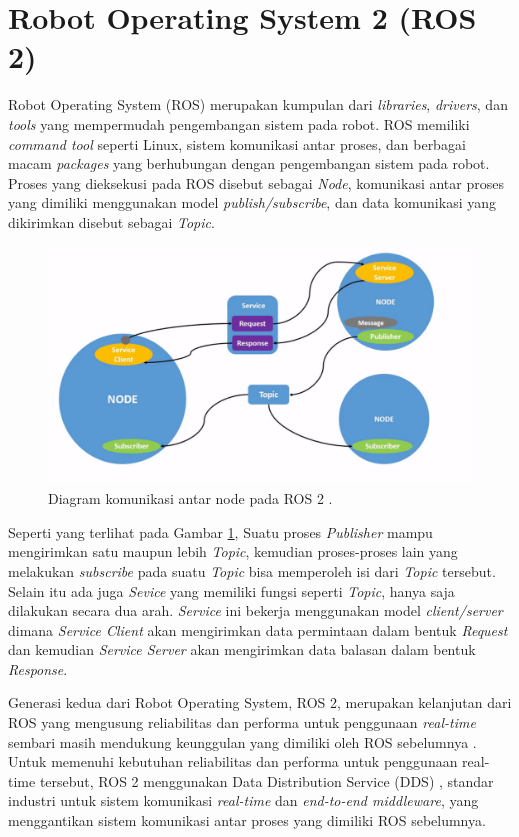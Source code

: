 \section{Robot Operating System 2 (ROS 2)}
\label{sec:sociallyassistiverobots}

Robot Operating System (ROS) \citep{cit:quigley2009} merupakan kumpulan dari \emph{libraries}, \emph{drivers}, dan \emph{tools} yang mempermudah pengembangan sistem pada robot.
ROS memiliki \emph{command tool} seperti Linux, sistem komunikasi antar proses, dan berbagai macam \emph{packages} yang berhubungan dengan pengembangan sistem pada robot.
Proses yang dieksekusi pada ROS disebut sebagai \emph{Node}, komunikasi antar proses yang dimiliki menggunakan model \emph{publish/subscribe}, dan data komunikasi yang dikirimkan disebut sebagai \emph{Topic}.

\begin{figure} [ht]
  \centering
	\includegraphics[scale=0.45]{gambar/komunikasi-ros.png}
	\caption{Diagram komunikasi antar node pada ROS 2 \citep{url:ros2nodes}.}
	\label{fig:komunikasiros}
\end{figure}

Seperti yang terlihat pada Gambar \ref{fig:komunikasiros}, Suatu proses \emph{Publisher} mampu mengirimkan satu maupun lebih \emph{Topic}, kemudian proses-proses lain yang melakukan \emph{subscribe} pada suatu \emph{Topic} bisa memperoleh isi dari \emph{Topic} tersebut.
Selain itu ada juga \emph{Sevice} yang memiliki fungsi seperti \emph{Topic}, hanya saja dilakukan secara dua arah.
\emph{Service} ini bekerja menggunakan model \emph{client/server} dimana \emph{Service Client} akan mengirimkan data permintaan dalam bentuk \emph{Request} dan kemudian \emph{Service Server} akan mengirimkan data balasan dalam bentuk \emph{Response}.

Generasi kedua dari Robot Operating System, ROS 2, merupakan kelanjutan dari ROS yang mengusung reliabilitas dan performa untuk penggunaan \emph{real-time} sembari masih mendukung keunggulan yang dimiliki oleh ROS sebelumnya \citep{cit:maruyama2016}.
Untuk memenuhi kebutuhan reliabilitas dan performa untuk penggunaan real-time tersebut, ROS 2 menggunakan Data Distribution Service (DDS) \citep{cit:castellote2003} \citep{cit:schlesselman2004}, standar industri untuk sistem komunikasi \emph{real-time} dan \emph{end-to-end middleware}, yang menggantikan sistem komunikasi antar proses yang dimiliki ROS sebelumnya.
